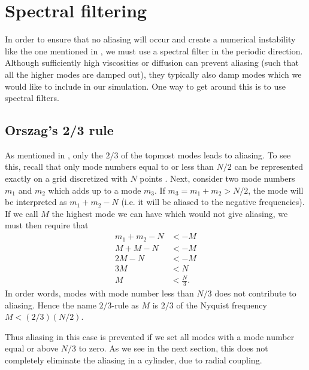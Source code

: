 \section{Spectral filtering}
%
In order to ensure that no aliasing will occur and create a numerical instability like the one mentioned in \cite{Phillips1959}, we must use a spectral filter in the periodic direction.
Although sufficiently high viscosities or diffusion can prevent aliasing (such that all the higher modes are damped out), they typically also damp modes which we would like to include in our simulation.
One way to get around this is to use spectral filters.

\subsection{Orszag's 2/3 rule}
As mentioned in \cite{Orszag1971}, only the $2/3$ of the topmost modes leads to aliasing.
To see this, recall that only mode numbers equal to or less than $N/2$ can be represented exactly on a grid discretized with $N$ points \cite{Bracewell2000book}.
Next, consider two mode numbers $m_1$ and $m_2$ which adds up to a mode $m_3$.
If $m_3=m_1+m_2>N/2$, the mode will be interpreted as $m_1+m_2 - N$ (i.e. it will be aliased to the negative frequencies).
If we call $M$ the highest mode we can have which would not give aliasing, we must then require that
%
\begin{align*}
    m_1+m_2 - N &< -M\\
    M + M - N &< -M\\
    2M - N &< -M\\
    3M &<  N\\
    M &< \frac{N}{3}.
\end{align*}
%
In order words, modes with mode number less than $N/3$ does not contribute to aliasing.
Hence the name $2/3$-rule as $M$ is $2/3$ of the Nyquist frequency $M < (2/3)(N/2)$.

Thus aliasing in this case is prevented if we set all modes with a mode number equal or above $N/3$ to zero.
As we see in the next section, this does not completely eliminate the aliasing in a cylinder, due to radial coupling.

